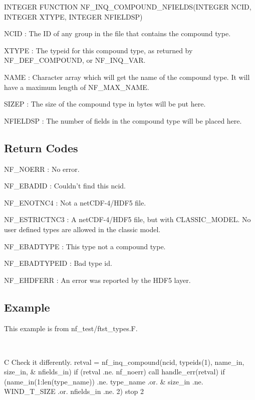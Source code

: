 I\+N\+T\+E\+G\+ER F\+U\+N\+C\+T\+I\+ON N\+F\+\_\+\+I\+N\+Q\+\_\+\+C\+O\+M\+P\+O\+U\+N\+D\+\_\+\+N\+F\+I\+E\+L\+DS(I\+N\+T\+E\+G\+ER N\+C\+ID, I\+N\+T\+E\+G\+ER X\+T\+Y\+PE, I\+N\+T\+E\+G\+ER N\+F\+I\+E\+L\+D\+SP)

{\ttfamily N\+C\+ID} \+: The ID of any group in the file that contains the compound type.

{\ttfamily X\+T\+Y\+PE} \+: The typeid for this compound type, as returned by N\+F\+\_\+\+D\+E\+F\+\_\+\+C\+O\+M\+P\+O\+U\+ND, or N\+F\+\_\+\+I\+N\+Q\+\_\+\+V\+AR.

{\ttfamily N\+A\+ME} \+: Character array which will get the name of the compound type. It will have a maximum length of N\+F\+\_\+\+M\+A\+X\+\_\+\+N\+A\+ME.

{\ttfamily S\+I\+Z\+EP} \+: The size of the compound type in bytes will be put here.

{\ttfamily N\+F\+I\+E\+L\+D\+SP} \+: The number of fields in the compound type will be placed here.

\subsection*{Return Codes }

{\ttfamily N\+F\+\_\+\+N\+O\+E\+RR} \+: No error.

{\ttfamily N\+F\+\_\+\+E\+B\+A\+D\+ID} \+: Couldn’t find this ncid.

{\ttfamily N\+F\+\_\+\+E\+N\+O\+T\+N\+C4} \+: Not a net\+C\+D\+F-\/4/\+H\+D\+F5 file.

{\ttfamily N\+F\+\_\+\+E\+S\+T\+R\+I\+C\+T\+N\+C3} \+: A net\+C\+D\+F-\/4/\+H\+D\+F5 file, but with C\+L\+A\+S\+S\+I\+C\+\_\+\+M\+O\+D\+EL. No user defined types are allowed in the classic model.

{\ttfamily N\+F\+\_\+\+E\+B\+A\+D\+T\+Y\+PE} \+: This type not a compound type.

{\ttfamily N\+F\+\_\+\+E\+B\+A\+D\+T\+Y\+P\+E\+ID} \+: Bad type id.

{\ttfamily N\+F\+\_\+\+E\+H\+D\+F\+E\+RR} \+: An error was reported by the H\+D\+F5 layer.

\subsection*{Example }

This example is from nf\+\_\+test/ftst\+\_\+types.\+F.

 

C Check it differently. retval = nf\+\_\+inq\+\_\+compound(ncid, typeids(1), name\+\_\+in, size\+\_\+in, \& nfields\+\_\+in) if (retval .ne. nf\+\_\+noerr) call handle\+\_\+err(retval) if (name\+\_\+in(1\+:len(type\+\_\+name)) .ne. type\+\_\+name .or. \& size\+\_\+in .ne. W\+I\+N\+D\+\_\+\+T\+\_\+\+S\+I\+ZE .or. nfields\+\_\+in .ne. 2) stop 2

